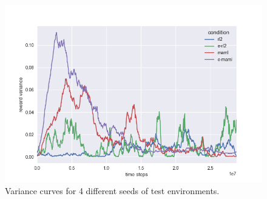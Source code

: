 \begin{figure}[H]
\begin{center}
\includegraphics[scale=0.335]{bradly_curves/64testgridvar3.png}
\end{center}
\caption{Variance curves for 4 different seeds of test environments.}
\label{fig:apprendix-variance-curves-1}
\end{figure} 

